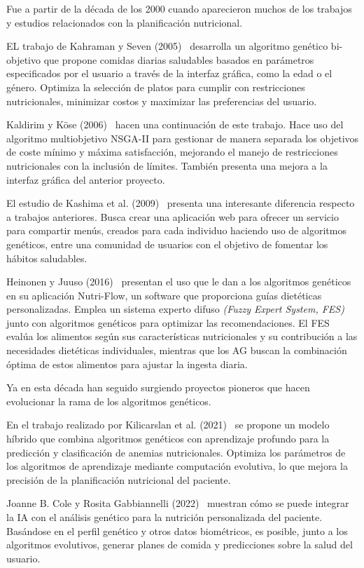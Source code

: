 Fue a partir de la década de los 2000 cuando aparecieron muchos de los trabajos y estudios relacionados con la planificación nutricional.

EL trabajo de Kahraman y Seven (2005)~\cite{kahraman2005} desarrolla un algoritmo genético bi-objetivo que propone comidas diarias saludables basados en parámetros especificados por el usuario a través de la interfaz gráfica, como la edad o el género. Optimiza la selección de platos para cumplir con restricciones nutricionales, minimizar costos y maximizar las preferencias del usuario.

Kaldirim y Köse (2006)~\cite{kaldirim2006} hacen una continuación de este trabajo. Hace uso del algoritmo multiobjetivo NSGA-II para gestionar de manera separada los objetivos de coste mínimo y máxima satisfacción, mejorando el manejo de restricciones nutricionales con la inclusión de límites. También presenta una mejora a la interfaz gráfica del anterior proyecto.

El estudio de Kashima et al. (2009)~\cite{kashima2009} presenta una interesante diferencia respecto a trabajos anteriores. Busca crear una aplicación web para ofrecer un servicio para compartir menús, creados para cada individuo haciendo uso de algoritmos genéticos, entre una comunidad de usuarios con el objetivo de fomentar los hábitos saludables.

Heinonen y Juuso (2016)~\cite{heinonen2016} presentan el uso que le dan a los algoritmos genéticos en su aplicación Nutri-Flow, un software que proporciona guías dietéticas personalizadas. Emplea un sistema experto difuso \textit{(Fuzzy Expert System, FES)} junto con algoritmos genéticos para optimizar las recomendaciones. El FES evalúa los alimentos según sus características nutricionales y su contribución a las necesidades dietéticas individuales, mientras que los AG buscan la combinación óptima de estos alimentos para ajustar la ingesta diaria.

Ya en esta década han seguido surgiendo proyectos pioneros que hacen evolucionar la rama de los algoritmos genéticos.

En el trabajo realizado por Kilicarslan et al. (2021)~\cite{KILICARSLAN2021102231} se propone un modelo híbrido que combina algoritmos genéticos con aprendizaje profundo para la predicción y clasificación de anemias nutricionales. Optimiza los parámetros de los algoritmos de aprendizaje mediante computación evolutiva, lo que mejora la precisión de la planificación nutricional del paciente.

Joanne B. Cole y Rosita Gabbiannelli (2022)~\cite{cole2022} muestran cómo se puede integrar la IA con el análisis genético para la nutrición personalizada del paciente. Basándose en el perfil genético y otros datos biométricos, es posible, junto a los algoritmos evolutivos, generar planes de comida y predicciones sobre la salud del usuario.




